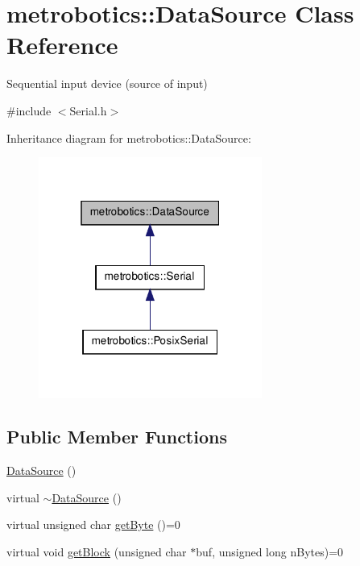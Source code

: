 \hypertarget{classmetrobotics_1_1DataSource}{\section{metrobotics\-:\-:\-Data\-Source \-Class \-Reference}
\label{classmetrobotics_1_1DataSource}
}


\-Sequential input device (source of input)  




{\ttfamily \#include $<$\-Serial.\-h$>$}



\-Inheritance diagram for metrobotics\-:\-:\-Data\-Source\-:
\nopagebreak
\begin{figure}[H]
\begin{center}
\leavevmode
\includegraphics[width=208pt]{classmetrobotics_1_1DataSource__inherit__graph}
\end{center}
\end{figure}
\subsection*{\-Public \-Member \-Functions}
\begin{DoxyCompactItemize}
\item 
\hyperlink{classmetrobotics_1_1DataSource_addb9641cde1b46a961b7cc6bc0c79020}{\-Data\-Source} ()
\item 
virtual \hyperlink{classmetrobotics_1_1DataSource_ac9a5549a460a2b0afd92255f64954ed2}{$\sim$\-Data\-Source} ()
\item 
virtual unsigned char \hyperlink{classmetrobotics_1_1DataSource_afffac0648e7674e381f961eab00a5982}{get\-Byte} ()=0
\item 
virtual void \hyperlink{classmetrobotics_1_1DataSource_a6bb6b185d3995cac7a74d5c82cd54d6b}{get\-Block} (unsigned char $\ast$buf, unsigned long n\-Bytes)=0
\end{DoxyCompactItemize}


